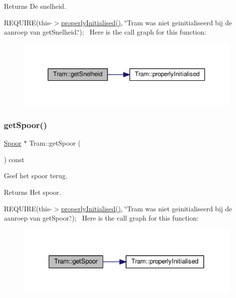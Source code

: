\begin{DoxyReturn}{Returns}
De snelheid.
\end{DoxyReturn}
R\+E\+Q\+U\+I\+RE(this-\/$>$\hyperlink{class_tram_ac2688f590e4db232b4f535c9bf959efb}{properly\+Initialised()}, \char`\"{}\+Tram was niet geinitialiseerd bij de aanroep van get\+Snelheid.\char`\"{});~\newline
Here is the call graph for this function\+:
\nopagebreak
\begin{figure}[H]
\begin{center}
\leavevmode
\includegraphics[width=333pt]{class_tram_aa8bcd980469801cb8524f170006f666c_cgraph}
\end{center}
\end{figure}
\mbox{\label{class_tram_aee9cf13e0525ac7c769709edf1ff987d}} 
\subsubsection{\texorpdfstring{get\+Spoor()}{getSpoor()}}
{\footnotesize\ttfamily \hyperlink{class_spoor}{Spoor} $\ast$ Tram\+::get\+Spoor (\begin{DoxyParamCaption}{ }\end{DoxyParamCaption}) const}



Geef het spoor terug. 

\begin{DoxyReturn}{Returns}
Het spoor.
\end{DoxyReturn}
R\+E\+Q\+U\+I\+RE(this-\/$>$\hyperlink{class_tram_ac2688f590e4db232b4f535c9bf959efb}{properly\+Initialised()}, \char`\"{}\+Tram was niet geinitialiseerd bij de aanroep van get\+Spoor.\char`\"{});~\newline
Here is the call graph for this function\+:
\nopagebreak
\begin{figure}[H]
\begin{center}
\leavevmode
\includegraphics[width=321pt]{class_tram_aee9cf13e0525ac7c769709edf1ff987d_cgraph}
\end{center}
\end{figure}
\mbox{\label{class_tram_abcb1ce0d10e394fce8a99b460e5104de}} 
